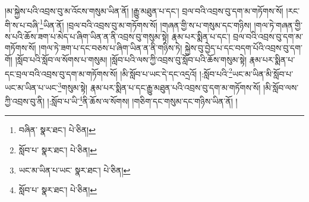 །མ་སྐྱེས་པའི་འབྲས་བུ་མ་འོངས་གསུམ་ཡིན་ནོ། །རྒྱུ་མཐུན་པ་དང་། བྲལ་བའི་འབྲས་བུ་དག་མ་གཏོགས་སོ། །རང་གི་ས་པ་བཞི་\footnote{བཞིན་  སྣར་ཐང་།  པེ་ཅིན། }ཡིན་ནོ། །བྲལ་བའི་འབྲས་བུ་མ་གཏོགས་སོ། །གཞན་གྱི་ས་པ་གསུམ་དང་གཉིས། །གལ་ཏེ་གཞན་གྱི་ས་པའི་ཆོས་ཟག་པ་མེད་པ་ཞིག་ཡིན་ན་ནི་འབྲས་བུ་གསུམ་སྟེ། རྣམ་པར་སྨིན་པ་དང་། བྲལ་བའི་འབྲས་བུ་དག་མ་གཏོགས་སོ། །གལ་ཏེ་ཟག་པ་དང་བཅས་པ་ཞིག་ཡིན་ན་ནི་གཉིས་ཏེ། སྐྱེས་བུ་བྱེད་པ་དང་བདག་པོའི་འབྲས་བུ་དག་གོ། །སློབ་པའི་སློབ་ལ་སོགས་པ་གསུམ། །སློབ་པའི་ལས་ཀྱི་འབྲས་བུ་སློབ་པའི་ཆོས་གསུམ་སྟེ། རྣམ་པར་སྨིན་པ་དང་བྲལ་བའི་འབྲས་བུ་དག་མ་གཏོགས་སོ། །མི་སློབ་པ་ཡང་དེ་དང་འདྲའོ། །:སློབ་པའི་\footnote{སློབ་པ་  སྣར་ཐང་།  པེ་ཅིན། }ཡང་མ་ཡིན་མི་སློབ་པ་ཡང་མ་ཡིན་པ་ཡང་\footnote{ཡང་མ་ཡིན་པ་ཡང་  སྣར་ཐང་།  པེ་ཅིན། }གསུམ་སྟེ། རྣམ་པར་སྨིན་པ་དང་རྒྱུ་མཐུན་པའི་འབྲས་བུ་དག་མ་གཏོགས་སོ། །མི་སློབ་ལས་ཀྱི་འབྲས་བུ་ནི། །:སློབ་པ་ཡི་\footnote{སློབ་པ་  སྣར་ཐང་།  པེ་ཅིན། }ནི་ཆོས་ལ་སོགས། །གཅིག་དང་གསུམ་དང་གཉིས་ཡིན་ནོ། །
